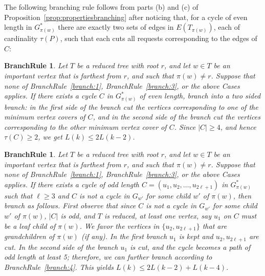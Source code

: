 \documentclass[11pt]{article}
\newtheorem{branchrule}[theorem]{BranchRule}
\begin{document}
The following branching rule follows from parts (b) and (c) of Proposition~\ref{prop:propertiesbranching} after noticing that, for a cycle of even length in $G^*_{\pi(w)}$ there are exactly two sets of edges in $E(T_{\pi(w)})$, each of cardinality $\tau(P)$, such that each cuts all requests corresponding to the edges of $C$:

\begin{branchrule}\label{branch:5}
Let $T$ be a reduced tree with root $r$, and let $w \in T$ be an important vertex that is farthest from $r$, and such that $\pi(w) \neq r$. Suppose that none of BranchRule~\ref{branch:1}, BranchRule~\ref{branch:3}, or the above Cases applies. If there exists a cycle $C$ in $G^*_{\pi(w)}$ of even length, branch into a two sided branch: in the first side of the branch cut the vertices corresponding to one of the minimum vertex covers of $C$, and in the second  side of the branch cut the vertices corresponding to the other minimum vertex cover of $C$.  Since $|C| \geq 4$, and hence $\tau(C) \geq 2$, we get $L(k) \leq 2L(k-2)$.
\end{branchrule}


\begin{branchrule}\label{branch:5}
Let $T$ be a reduced tree with root $r$, and let $w \in T$ be an important vertex that is farthest from $r$, and such that $\pi(w) \neq r$. Suppose that none of BranchRule~\ref{branch:1}, BranchRule~\ref{branch:3}, or the above Cases applies. If there exists a cycle of odd length $C=(u_1, u_2, \ldots, u_{2\ell+1})$ in $G^*_{\pi(w)}$ such that $\ell \geq 3$ and $C$ is not a cycle in $G_{w'}$ for some child $w'$ of $\pi(w)$, then branch as follows. First observe that since $C$ is not a cycle in $G_{w'}$ for some child $w'$ of $\pi(w)$, $|C|$ is odd, and $T$ is reduced, at least one vertex, say $u_1$ on $C$ must be a leaf child of $\pi(w)$. We favor the vertices in $\{u_2, u_{2\ell+1}\}$ that are grandchildren of $\pi(w)$ (if any). In the first branch $u_1$ is kept and $u_2, u_{2\ell+1}$ are cut. In the second side of the branch $u_1$ is cut, and the cycle becomes a path of odd length at least 5; therefore, we can further branch according to BranchRule~\ref{branch:4}. This yields $L(k) \leq 2L(k-2) + L(k-4)$.
\end{branchrule}
\end{document}
